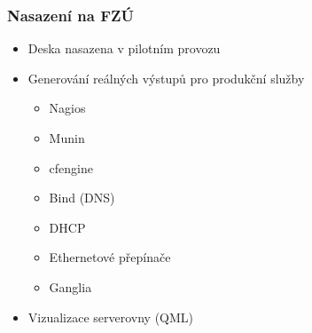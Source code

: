 \documentclass{beamer}
\begin{document}
\begin{frame}[fragile]
\frametitle{Nasazení na FZÚ}
\begin{itemize}
    \item Deska nasazena v pilotním provozu
        \item Generování reálných výstupů pro produkční služby
        \begin{itemize}
            \item Nagios
            \item Munin
            \item cfengine
            \item Bind (DNS)
            \item DHCP
            \item Ethernetové přepínače
            \item Ganglia
        \end{itemize}
    \item Vizualizace serverovny (QML)
\end{itemize}
\end{frame}
\end{document}
